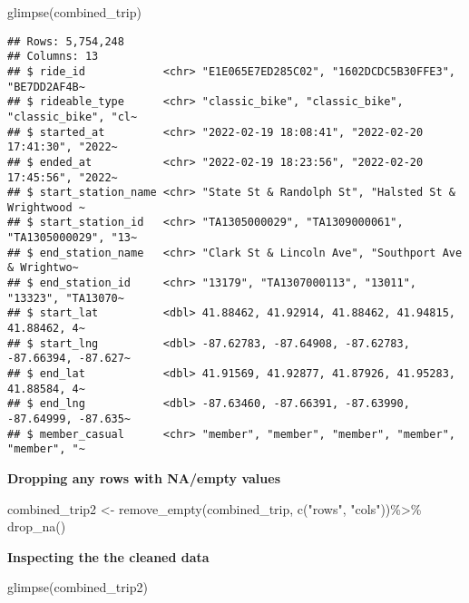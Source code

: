 \documentclass[
]{article}
\newenvironment{Shaded}{\begin{snugshade}}{\end{snugshade}}
\newcommand{\FunctionTok}[1]{\textcolor[rgb]{0.00,0.00,0.00}{#1}}
\newcommand{\NormalTok}[1]{#1}
\newcommand{\OtherTok}[1]{\textcolor[rgb]{0.56,0.35,0.01}{#1}}
\newcommand{\SpecialCharTok}[1]{\textcolor[rgb]{0.00,0.00,0.00}{#1}}
\newcommand{\StringTok}[1]{\textcolor[rgb]{0.31,0.60,0.02}{#1}}
\begin{document}
\begin{Shaded}
\begin{Highlighting}[]
\FunctionTok{glimpse}\NormalTok{(combined\_trip)}
\end{Highlighting}
\end{Shaded}

\begin{verbatim}
## Rows: 5,754,248
## Columns: 13
## $ ride_id            <chr> "E1E065E7ED285C02", "1602DCDC5B30FFE3", "BE7DD2AF4B~
## $ rideable_type      <chr> "classic_bike", "classic_bike", "classic_bike", "cl~
## $ started_at         <chr> "2022-02-19 18:08:41", "2022-02-20 17:41:30", "2022~
## $ ended_at           <chr> "2022-02-19 18:23:56", "2022-02-20 17:45:56", "2022~
## $ start_station_name <chr> "State St & Randolph St", "Halsted St & Wrightwood ~
## $ start_station_id   <chr> "TA1305000029", "TA1309000061", "TA1305000029", "13~
## $ end_station_name   <chr> "Clark St & Lincoln Ave", "Southport Ave & Wrightwo~
## $ end_station_id     <chr> "13179", "TA1307000113", "13011", "13323", "TA13070~
## $ start_lat          <dbl> 41.88462, 41.92914, 41.88462, 41.94815, 41.88462, 4~
## $ start_lng          <dbl> -87.62783, -87.64908, -87.62783, -87.66394, -87.627~
## $ end_lat            <dbl> 41.91569, 41.92877, 41.87926, 41.95283, 41.88584, 4~
## $ end_lng            <dbl> -87.63460, -87.66391, -87.63990, -87.64999, -87.635~
## $ member_casual      <chr> "member", "member", "member", "member", "member", "~
\end{verbatim}

\textbf{Dropping any rows with NA/empty values}

\begin{Shaded}
\begin{Highlighting}[]
\NormalTok{combined\_trip2 }\OtherTok{\textless{}{-}} \FunctionTok{remove\_empty}\NormalTok{(combined\_trip, }\FunctionTok{c}\NormalTok{(}\StringTok{"rows"}\NormalTok{, }\StringTok{"cols"}\NormalTok{))}\SpecialCharTok{\%\textgreater{}\%}
  \FunctionTok{drop\_na}\NormalTok{()}
\end{Highlighting}
\end{Shaded}

\textbf{Inspecting the the cleaned data}

\begin{Shaded}
\begin{Highlighting}[]
\FunctionTok{glimpse}\NormalTok{(combined\_trip2)}
\end{Highlighting}
\end{Shaded}
\end{document}
